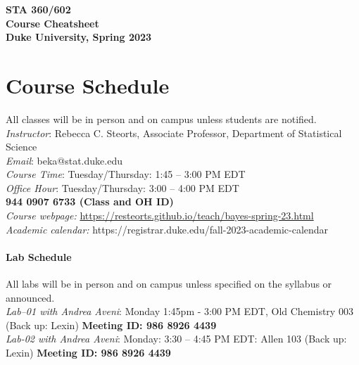 \documentclass[11pt]{article}
\date{}
\begin{document}
\begin{center}
{\Large\bf STA 360/602\\ Course Cheatsheet} \\

{\Large\bf Duke University, Spring 2023} \\
\end{center}


\section{Course Schedule}
All classes will be in person and on campus unless students are notified. 
\emph{Instructor}: Rebecca C. Steorts,  Associate Professor,  Department of Statistical Science\\
\emph{Email}: beka@stat.duke.edu\\
\emph{Course Time}: Tuesday/Thursday: 1:45 -- 3:00 PM EDT \\
\emph{Office Hour}: Tuesday/Thursday: 3:00 -- 4:00 PM EDT \\
\textbf{944 0907 6733 (Class and OH ID)}\\
\emph{Course webpage:} \url{https://resteorts.github.io/teach/bayes-spring-23.html} \\
\emph{Academic calendar:} https://registrar.duke.edu/fall-2023-academic-calendar


\paragraph{Lab Schedule}
All labs will be in person and on campus unless specified on the syllabus or announced. \\
\emph{Lab--01 with Andrea Aveni}: Monday 1:45pm - 3:00 PM EDT, Old Chemistry 003 (Back up: Lexin) 
\textbf{Meeting ID: 986 8926 4439} \\
\vspace*{1em}
\emph{Lab-02 with Andrea Aveni}: Monday: 3:30 -- 4:45 PM EDT: Allen 103 (Back up: Lexin) \textbf{Meeting ID: 986 8926 4439}\\
\end{document}
